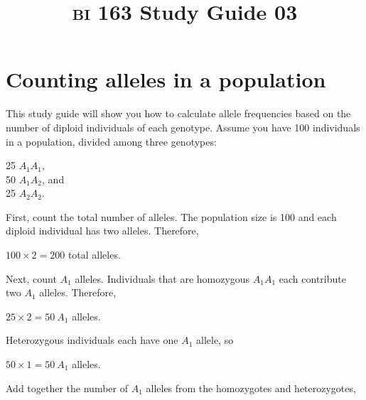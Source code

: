 \documentclass[letterpaper]{tufte-handout}
\title{{\scshape bi} 163 Study Guide 03}
\date{} %
\begin{document}
\maketitle	%

\section*{Counting alleles in a population}

This study guide%
%
will show you how to calculate allele frequencies 
based on the number of diploid individuals of each genotype. 
Assume you have 100 individuals in a population, divided among 
three genotypes: \vspace{\baselineskip}

25 $A_1A_1$, \\
50 $A_1A_2$, and \\
25 $A_2A_2$.

\vspace{\baselineskip}

First, count the total number of alleles. The population size
is 100 and each diploid individual has two alleles. Therefore,
\vspace{\baselineskip}

$100 \times 2 = 200$ total alleles.
\vspace{\baselineskip}

\noindent Next, count $A_1$ alleles. Individuals that are homozygous 
$A_1A_1$ each contribute two $A_1$ alleles. Therefore, 
\vspace{\baselineskip}

$25 \times 2 = 50\ A_1$ alleles. 
\vspace{\baselineskip}

\noindent Heterozygous individuals each have one $A_1$ allele, so
\vspace{\baselineskip}

$50 \times 1 = 50\ A_1$ alleles.
\vspace{\baselineskip}

\noindent Add together the number of $A_1$ alleles from the
homozygotes and heterozygotes,
\vspace{\baselineskip}
\end{document}
